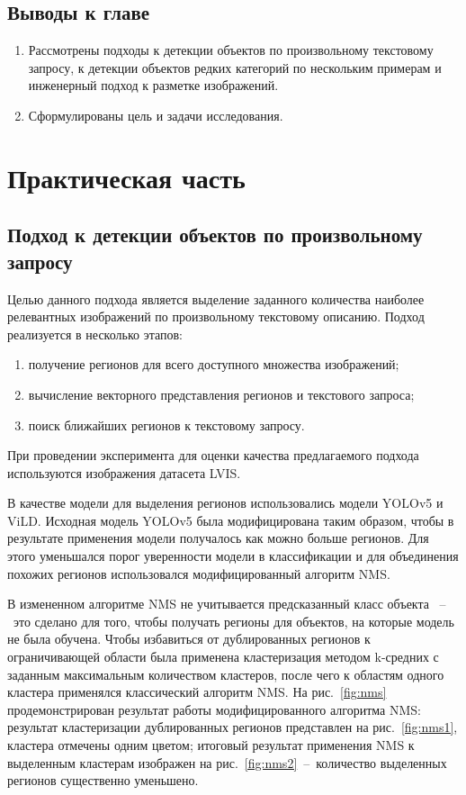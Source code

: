 \documentclass[a4paper,14pt]{article}
\begin{document}
    \subsection{Выводы к главе \thesection}
    \begin{enumerate}
        \itemsep0em
        \item Рассмотрены подходы к детекции объектов по произвольному текстовому запросу, к детекции объектов редких категорий по нескольким примерам и инженерный подход к разметке изображений.
        \item Сформулированы цель и задачи исследования.
    \end{enumerate}

    \newpage


    \section{Практическая часть}

    \subsection{Подход к детекции объектов по произвольному запросу}

    Целью данного подхода является выделение заданного количества наиболее релевантных изображений по произвольному текстовому описанию.
    Подход реализуется в несколько этапов:
    \begin{enumerate}
        [1)]
        \itemsep0em
        \item получение регионов для всего доступного множества изображений;
        \item вычисление векторного представления регионов и текстового запроса;
        \item поиск ближайших регионов к текстовому запросу.
    \end{enumerate}

    При проведении эксперимента для оценки качества предлагаемого подхода используются изображения датасета LVIS.

    В качестве модели для выделения регионов использовались модели YOLOv5 и ViLD.
    Исходная модель YOLOv5 была модифицирована таким образом, чтобы в результате применения модели получалось как можно больше регионов.
    Для этого уменьшался порог уверенности модели в классификации и для объединения похожих регионов использовался модифицированный алгоритм NMS.

    В измененном алгоритме NMS не учитывается предсказанный класс объекта ~--~это сделано для того, чтобы получать регионы для объектов, на которые модель не была обучена.
    Чтобы избавиться от дублированных регионов к ограничивающей области была применена кластеризация методом k-средних с заданным максимальным количеством кластеров, после чего к областям одного кластера применялся классический алгоритм NMS.
    На рис.~\ref{fig:nms} продемонстрирован результат работы модифицированного алгоритма NMS: результат кластеризации дублированных регионов представлен на рис.~\ref{fig:nms1}, кластера отмечены одним цветом; итоговый результат применения NMS к выделенным кластерам изображен на рис.~\ref{fig:nms2}~--~количество выделенных регионов существенно уменьшено.
\end{document}
